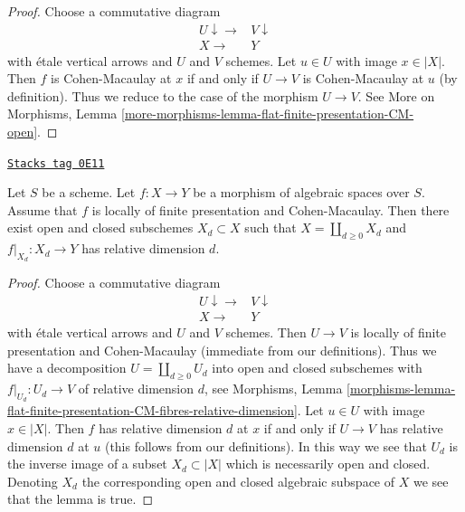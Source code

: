 \begin{proof}
Choose a commutative diagram
$$
\begin{array}{cc}U \downarrow\longrightarrow & V \downarrow \\ X \longrightarrow & Y\end{array}
$$
with \'etale vertical arrows and $U$ and $V$ schemes.
Let $u \in U$ with image $x \in |X|$.
Then $f$ is Cohen-Macaulay at $x$ if and only if $U \to V$ is
Cohen-Macaulay at $u$ (by definition).
Thus we reduce to the case of the morphism $U \to V$.
See More on Morphisms, Lemma
\ref{more-morphisms-lemma-flat-finite-presentation-CM-open}.
\end{proof}

\begin{lemma}
\label{spaces-more-morphisms-lemma-lfp-CM-relative-dimension}
\href{https://stacks.math.columbia.edu/tag/0E11}{\texttt{Stacks tag 0E11}}

Let $S$ be a scheme. Let $f : X \to Y$ be a
morphism of algebraic spaces over $S$. Assume that
$f$ is locally of finite presentation and Cohen-Macaulay.
Then there exist open and closed subschemes $X_d \subset X$
such that $X = \coprod_{d \geq 0} X_d$ and $f|_{X_d} : X_d \to Y$
has relative dimension $d$.
\end{lemma}

\begin{proof}
Choose a commutative diagram
$$
\begin{array}{cc}U \downarrow\longrightarrow & V \downarrow \\ X \longrightarrow & Y\end{array}
$$
with \'etale vertical arrows and $U$ and $V$ schemes.
Then $U \to V$ is locally of finite presentation and Cohen-Macaulay
(immediate from our definitions).
Thus we have a decomposition $U = \coprod_{d \geq 0} U_d$
into open and closed subschemes with $f|_{U_d} : U_d \to V$
of relative dimension $d$, see Morphisms, Lemma
\ref{morphisms-lemma-flat-finite-presentation-CM-fibres-relative-dimension}.
Let $u \in U$ with image $x \in |X|$. Then
$f$ has relative dimension $d$ at $x$ if and only if
$U \to V$ has relative dimension $d$ at $u$
(this follows from our definitions).
In this way we see that $U_d$ is the inverse image
of a subset $X_d \subset |X|$ which is necessarily
open and closed. Denoting $X_d$ the corresponding open
and closed algebraic subspace of $X$ we see that the lemma is true.
\end{proof}

